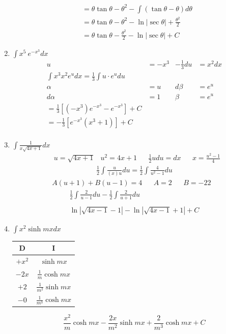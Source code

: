 \documentclass[12pt]{article}
\begin{document}
\begin{enumerate}
\begin{align*}
            &=\theta\tan\theta-\theta^2-\int (\tan\theta-\theta)d\theta \\
            &= \theta\tan\theta-\theta^2-\ln{|\sec{\theta}|}+\frac{\theta^2}{2} \\
            &= \theta\tan\theta-\frac{\theta^2}{2}-\ln{|\sec{\theta}|}+C             
        \end{align*}
    \addtocounter{enumi}{3}\item $\int x^5 \ e^{-x^3}dx$
        \begin{align*}
            u &= -x^3 &-\frac{1}{3}du &= x^2dx\\
            \int x^3x^2e^udx = \frac{1}{3}\int u\cdot e^u du\\
            \alpha &= u &d\beta &= e^u\\
            d\alpha &= 1 &\beta &= e^u\\
            =\frac{1}{3}\left[(-x^3)e^{-x^3} - e^{-x^3}\right] + C\\
            =-\frac{1}{3}\left[e^{-x^3}(x^3+1)\right] + C\\
        \end{align*}\newpage
    \addtocounter{enumi}{3}\item $\int\frac{1}{x\sqrt{4x+1}}dx$
        \begin{align*}
            &u = \sqrt{4x+1} & u^2=4x+1 && \frac{1}{2}udu=dx &&x=\frac{u^2-1}{4}
        \end{align*}
        \begin{align*}
            \frac{1}{2}\int\frac{u}{(x)u}du = \frac{1}{2}\int\frac{4}{u^2-1}du
        \end{align*}
        \begin{align*}
            A(u+1)+B(u-1)=4 && A = 2 && B = -22 &
        \end{align*}
        \begin{align*}
            \frac{1}{2}\int\frac{2}{u-1}du-\frac{1}{2}\int\frac{2}{u+1} du\\\\
            \ln{|\sqrt{4x-1}-1|} - \ln{|\sqrt{4x-1}+1|} + C             
        \end{align*}
    \addtocounter{enumi}{3}\item $\int x^2\sinh{mx}dx$\newline\newline
        \begin{tabular}{c|c}
            D & I \\\hline
            $+x^2$  & $\sinh{mx}$\\\hline
            $-2x$ & $\frac{1}{m}\cosh{mx}$\\\hline
            $+2$ & $\frac{1}{m^2}\sinh{mx}$\\\hline
            $-0$ & $\frac{1}{m^3}\cosh{mx}$\\\hline
        \end{tabular}
        \begin{equation*}
            \frac{x^2}{m}\cosh{mx}-\frac{2x}{m^2}\sinh{mx}+\frac{2}{m^3}\cosh{mx}+C
        \end{equation*}
\end{enumerate}
\end{document}
